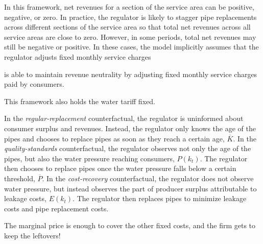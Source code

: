 \documentclass[12pt,table]{article}
\begin{document}
In this framework, net revenues for a section of the service area can be positive, negative, or zero.  In practice, the regulator is likely to stagger pipe replacements across different sections of the service area so that total net revenues across all service areas are close to zero.  However, in some periods, total net revenues may still be negative or positive.  In these cases, the model implicitly assumes that the regulator adjusts fixed monthly service charges 

is able to maintain revenue neutrality by adjusting fixed monthly service charges paid by consumers.  





This framework also holds the water tariff fixed.  



In the \textit{regular-replacement} counterfactual, the regulator is uninformed about consumer surplus and revenues.  Instead, the regulator only knows the age of the pipes and chooses to replace pipes as soon as they reach a certain age, $\overline{K}$.  In the \textit{quality-standards} counterfactual, the regulator observes not only the age of the pipes, but also the water pressure reaching consumers, $P(k_t)$.  The regulator then chooses to replace pipes once the water pressure falls below a certain threshold, $\overline{P}$.  In the \textit{cost-recovery} counterfactual, the regulator does not observe water pressure, but instead observes the part of producer surplus attributable to leakage costs, $E(k_t)$.  The regulator then replaces pipes to minimize leakage costs and pipe replacement costs.  



The marginal price is enough to cover the other fixed costs, and the firm gets to keep the leftovers!
\end{document}
